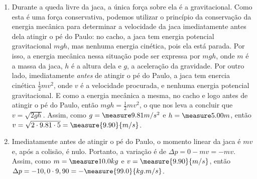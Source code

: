 \begin{question}
	\begin{solution}
		\begin{enumerate}
			\item Durante a queda livre da jaca, a única força sobre ela é a gravitacional.
			Como esta é uma força conservativa, podemos utilizar o princípio da conservação da energia mecânica para determinar a velocidade da jaca imediatamente antes dela atingir o pé do Paulo: no cacho, a jaca tem energia potencial gravitacional $mgh$, mas nenhuma energia cinética, pois ela está parada.
			Por isso, a energia mecânica nessa situação pode ser expressa por $mgh$, onde $m$ é a massa da jaca, $h$ é a altura dela e $g$, a aceleração da gravidade.
			Por outro lado, imediatamente \emph{antes} de atingir o pé do Paulo, a jaca tem enercia cinética $\frac{1}{2}mv^2$, onde $v$ é a velocidade procurada, e nenhuma energia potencial gravitacional.
			E como a energia mecânica a mesma, no cacho e logo antes de atingir o pé do Paulo, então $mgh = \frac{1}{2}mv^2$, o que nos leva a concluir que $v = \sqrt{2gh}$.
			Assim, como $g = \GRAVITY$ e $h = \HEIGHT$, então $v = \sqrt{2 \cdot 9.81 \cdot 5} = \measure{9.90}{m/s}$.

			\item Imediatamente antes de atingir o pé do Paulo, o momento linear da jaca é $mv$ e, após a colisão, é nulo.
			Portanto, a variação é de $\Delta p = 0 - mv = -mv$.
			Assim, como $m = \MASS$ e $v = \measure{9.90}{m/s}$, então $\Delta p = -10,0 \cdot 9,90 = -\measure{99.0}{kg.m/s}$.

		\end{enumerate}
	\end{solution}
\end{question}

